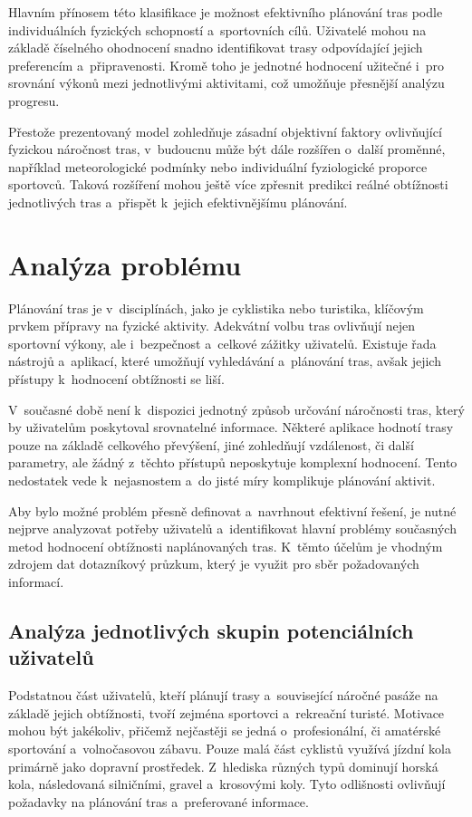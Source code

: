 Hlavním přínosem této klasifikace je možnost efektivního plánování tras podle individuálních fyzických schopností a~sportovních cílů.
Uživatelé mohou na základě číselného ohodnocení snadno identifikovat trasy odpovídající jejich preferencím a~připravenosti.
Kromě toho je jednotné hodnocení užitečné i~pro srovnání výkonů mezi jednotlivými aktivitami, což umožňuje přesnější analýzu progresu.

Přestože prezentovaný model zohledňuje zásadní objektivní faktory ovlivňující fyzickou náročnost tras, v~budoucnu může být dále rozšířen o~další proměnné, například meteorologické podmínky nebo individuální fyziologické proporce sportovců.
Taková rozšíření mohou ještě více zpřesnit predikci reálné obtížnosti jednotlivých tras a~přispět k~jejich efektivnějšímu plánování.

\chapter{Analýza problému}
\label{problem-analysis}

Plánování tras je v~disciplínách, jako je cyklistika nebo turistika, klíčovým prvkem přípravy na fyzické aktivity.
Adekvátní volbu tras ovlivňují nejen sportovní výkony, ale i~bezpečnost a~celkové zážitky uživatelů.
Existuje řada nástrojů a~aplikací, které umožňují vyhledávání a~plánování tras, avšak jejich přístupy k~hodnocení obtížnosti se liší.

V~současné době není k~dispozici jednotný způsob určování náročnosti tras, který by uživatelům poskytoval srovnatelné informace.
Některé aplikace hodnotí trasy pouze na základě celkového převýšení, jiné zohledňují vzdálenost, či další parametry, ale žádný z~těchto přístupů neposkytuje komplexní hodnocení.
Tento nedostatek vede k~nejasnostem a~do jisté míry komplikuje plánování aktivit.

Aby bylo možné problém přesně definovat a~navrhnout efektivní řešení, je nutné nejprve analyzovat potřeby uživatelů a~identifikovat hlavní problémy současných metod hodnocení obtížnosti naplánovaných tras.
K~těmto účelům je vhodným zdrojem dat dotazníkový průzkum, který je využit pro sběr požadovaných informací.

\section{Analýza jednotlivých skupin potenciálních uživatelů}
\label{analysis-of-individual-groups-of-potential-users}

Podstatnou část uživatelů, kteří plánují trasy a~související náročné pasáže na základě jejich obtížnosti, tvoří zejména sportovci a~rekreační turisté.
Motivace mohou být jakékoliv, přičemž nejčastěji se jedná o~profesionální, či amatérské sportování a~volnočasovou zábavu.
Pouze malá část cyklistů využívá jízdní kola primárně jako dopravní prostředek.
Z~hlediska různých typů dominují horská kola, následovaná silničními, gravel a~krosovými koly.
Tyto odlišnosti ovlivňují požadavky na plánování tras a~preferované informace.

